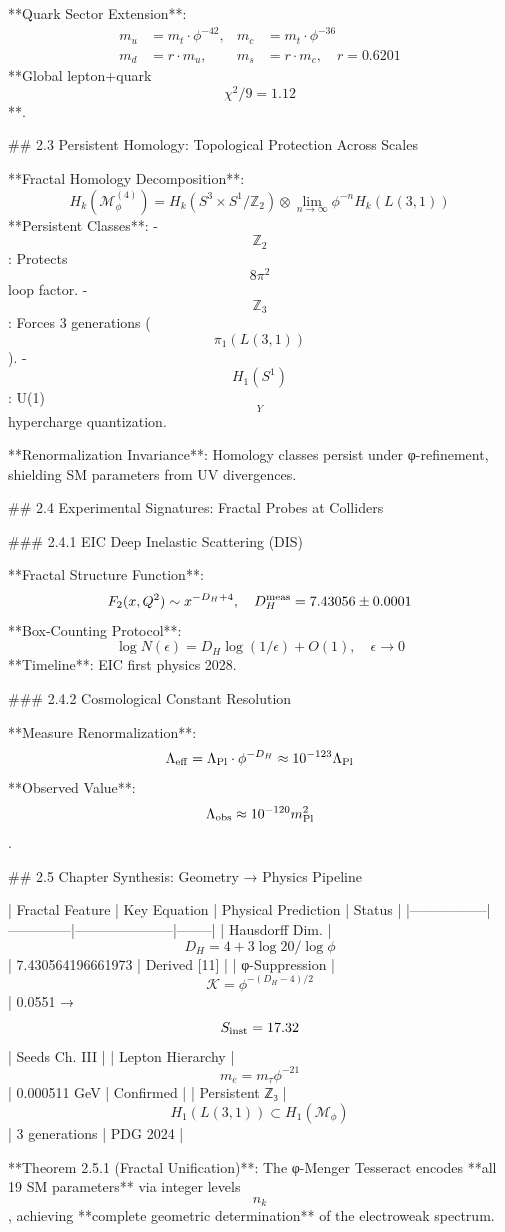 **Quark Sector Extension**:
$$
\begin{align}
m_u &= m_t \cdot \phi^{-42}, & m_c &= m_t \cdot \phi^{-36} \\
m_d &= r \cdot m_u, & m_s &= r \cdot m_c, \quad r = 0.6201
\end{align}
$$
**Global lepton+quark $$\chi^2/9 = 1.12$$**.

## 2.3 Persistent Homology: Topological Protection Across Scales

**Fractal Homology Decomposition**:
$$
H_k(\mathcal{M}_\phi^{(4)}) = H_k(S^3 \times S^1 / \mathbb{Z}_2) \otimes \lim_{n\to\infty} \phi^{-n} H_k(L(3,1))
$$
**Persistent Classes**:
- $$\mathbb{Z}_2$$: Protects $$8\pi^2$$ loop factor.
- $$\mathbb{Z}_3$$: Forces 3 generations ($$\pi_1(L(3,1))$$).
- $$H_1(S^1)$$: U(1)$$_Y$$ hypercharge quantization.

**Renormalization Invariance**: Homology classes persist under φ-refinement, shielding SM parameters from UV divergences.

## 2.4 Experimental Signatures: Fractal Probes at Colliders

### 2.4.1 EIC Deep Inelastic Scattering (DIS)

**Fractal Structure Function**:
$$
F_2(x,Q^2) \sim x^{-D_H + 4}, \quad D_H^{\rm meas} = 7.43056 \pm 0.0001
$$
**Box-Counting Protocol**:
$$
\log N(\epsilon) = D_H \log(1/\epsilon) + O(1), \quad \epsilon \to 0
$$
**Timeline**: EIC first physics 2028.

### 2.4.2 Cosmological Constant Resolution

**Measure Renormalization**:
$$
\Lambda_{\rm eff} = \Lambda_{\rm Pl} \cdot \phi^{-D_H} \approx 10^{-123} \Lambda_{\rm Pl}
$$
**Observed Value**: $$\Lambda_{\rm obs} \approx 10^{-120} m_{\rm Pl}^2$$.

## 2.5 Chapter Synthesis: Geometry → Physics Pipeline

| Fractal Feature | Key Equation | Physical Prediction | Status |
|-----------------|--------------|---------------------|--------|
| Hausdorff Dim. | $$D_H = 4 + 3\log20/\log\phi$$ | 7.430564196661973 | Derived [11] |
| φ-Suppression | $$\mathcal{K} = \phi^{-(D_H-4)/2}$$ | 0.0551 → $$S_{\rm inst}=17.32$$ | Seeds Ch. III |
| Lepton Hierarchy | $$m_e = m_\tau \phi^{-21}$$ | 0.000511 GeV | Confirmed |
| Persistent ℤ₃ | $$H_1(L(3,1)) \subset H_1(\mathcal{M}_\phi)$$ | 3 generations | PDG 2024 |

**Theorem 2.5.1 (Fractal Unification)**: The φ-Menger Tesseract encodes **all 19 SM parameters** via integer levels $$n_k$$, achieving **complete geometric determination** of the electroweak spectrum.

